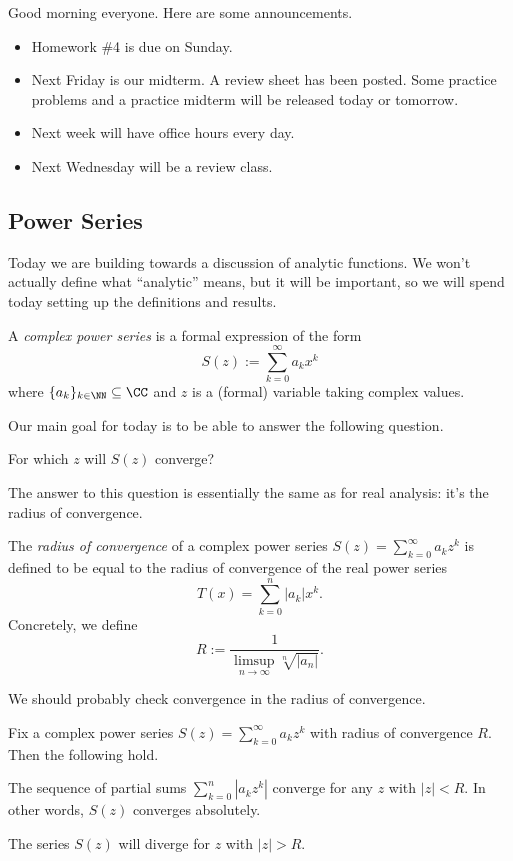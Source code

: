 
Good morning everyone. Here are some announcements.
\begin{itemize}
	\item Homework \#4 is due on Sunday.
	\item Next Friday is our midterm. A review sheet has been posted. Some practice problems and a practice midterm will be released today or tomorrow.
	\item Next week will have office hours every day.
	\item Next Wednesday will be a review class.
\end{itemize}

\subsection{Power Series}
Today we are building towards a discussion of analytic functions. We won't actually define what ``analytic'' means, but it will be important, so we will spend today setting up the definitions and results.
\begin{definition}
	A \textit{complex power series} is a formal expression of the form
	\[S(z):=\sum_{k=0}^\infty a_kx^k\]
	where $\{a_k\}_{k\in\NN}\subseteq\CC$ and $z$ is a (formal) variable taking complex values.
\end{definition}
Our main goal for today is to be able to answer the following question.
\begin{ques}
	For which $z$ will $S(z)$ converge?
\end{ques}
The answer to this question is essentially the same as for real analysis: it's the radius of convergence.
\begin{definition}
	The \textit{radius of convergence} of a complex power series $S(z)=\sum_{k=0}^\infty a_kz^k$ is defined to be equal to the radius of convergence of the real power series
	\[T(x)=\sum_{k=0}^n|a_k|x^k.\]
	Concretely, we define
	\[R:=\frac1{\limsup_{n\to\infty}\sqrt[n]{|a_n|}}.\]
\end{definition}
We should probably check convergence in the radius of convergence.
\begin{prop} \label{prop:radconverge}
	Fix a complex power series $S(z)=\sum_{k=0}^\infty a_kz^k$ with radius of convergence $R$. Then the following hold.
	\begin{listalph}
		\item The sequence of partial sums $\sum_{k=0}^n\left|a_kz^k\right|$ converge for any $z$ with $|z|<R$. In other words, $S(z)$ converges absolutely.
		\item The series $S(z)$ will diverge for $z$ with $|z|>R$.
	\end{listalph}
\end{prop}
